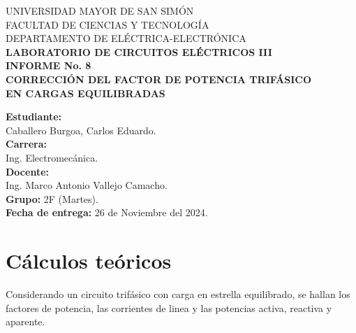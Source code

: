 \documentclass[letter,11pt]{article}
\begin{document}
\begin{titlepage}
    \begin{center}
        {\Large UNIVERSIDAD MAYOR DE SAN SIMÓN}\\
        \vspace*{0.15cm}
        {\large FACULTAD DE CIENCIAS Y TECNOLOGÍA}\\
        \vspace*{0.10cm}
        DEPARTAMENTO DE ELÉCTRICA-ELECTRÓNICA\\
        \vspace*{3.0cm}
        {\Large \textbf{LABORATORIO DE CIRCUITOS ELÉCTRICOS III}}\\
        \vspace*{0.3cm}
        {\Large \textbf{INFORME No. 8}}\\
        \vspace*{3.5cm}
        {\Large \textbf{CORRECCIÓN DEL FACTOR DE POTENCIA TRIFÁSICO\\
        EN CARGAS EQUILIBRADAS}}\\
    \end{center}

    \vspace*{5.3cm}
    \leftskip=7.95cm
    \noindent
    \textbf{Estudiante:}\\
    Caballero Burgoa, Carlos Eduardo.\\
    \newline
    \textbf{Carrera:}\\
    Ing. Electromecánica.\\
    \newline
    \textbf{Docente:}\\
    Ing. Marco Antonio Vallejo Camacho.\\
    \newline
    \textbf{Grupo:} 2F (Martes).\\
\textbf{Fecha de entrega:} 26 de Noviembre del 2024.\\
\end{titlepage}

\section{Cálculos teóricos}
Considerando un circuito trifásico con carga en estrella equilibrado, se hallan
los factores de potencia, las corrientes de linea y las potencias activa,
reactiva y aparente.
\end{document}
